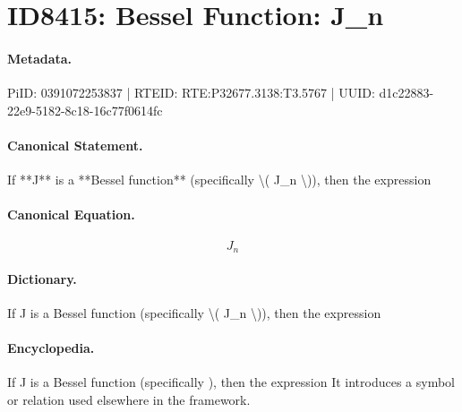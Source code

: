 \section*{ID8415: Bessel Function: J\_n}
\paragraph{Metadata.}
PiID: 0391072253837 | RTEID: RTE:P32677.3138:T3.5767 | UUID: d1c22883-22e9-5182-8c18-16c77f0614fc

\paragraph{Canonical Statement.}
If **J** is a **Bessel function** (specifically \textbackslash{}( J\_n \textbackslash{})), then the expression

\paragraph{Canonical Equation.}
\[
J_n
\]

\paragraph{Dictionary.}
If J is a Bessel function (specifically \textbackslash{}( J\_n \textbackslash{})), then the expression

\paragraph{Encyclopedia.}
If J is a Bessel function (specifically ), then the expression It introduces a symbol or relation used elsewhere in the framework.

